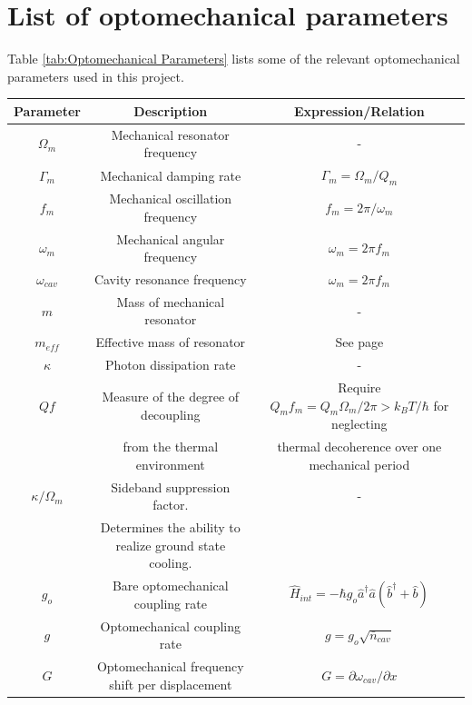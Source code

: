 \documentclass[%
 reprint,
nofootinbib,
 amsmath,amssymb,
 aps,
]{revtex4-2}
\begin{document}
\section{List of optomechanical parameters}
\flushleft
Table \ref{tab:Optomechanical Parameters} lists some of the relevant optomechanical parameters used in this project. 



\begin{table}[t]
    \centering
    \begin{tabular}{|c||c|c|}
    \hline
    Parameter & Description & Expression/Relation \\
    \hline
    
    $\Omega_m$ & Mechanical resonator frequency & - \\
    \hline
    $\Gamma_m$ & Mechanical damping rate & $\Gamma_m = \Omega_m / Q_m$ \\
    \hline
    $f_m$ & Mechanical oscillation frequency & $f_m = 2\pi/ \omega_m$ \\
    \hline
    $\omega_m$ & Mechanical angular frequency & $\omega_m = 2\pi f_m$ \\
    \hline
    $\omega_{cav}$ & Cavity resonance frequency & $\omega_m = 2\pi f_m$ \\
    \hline
    $m$ & Mass of mechanical resonator & - \\
    \hline
    $m_{eff}$ & Effective mass of resonator & See page \pageref{Vibrational Energy} \\
    \hline
    $\kappa$ & Photon dissipation rate & - \\
    \hline
    $Qf$ & Measure of the degree of decoupling & Require $Q_m f_m = Q_m \Omega_m /2\pi > k_B T / \hbar$ for neglecting \\ 
    & from the thermal environment  &  thermal decoherence over one mechanical period \\
    \hline
    $\kappa / \Omega_m$ & Sideband suppression factor.  & - \\
    & Determines the ability to realize ground state cooling.  & \\
    \hline
    $g_o$ & Bare optomechanical coupling rate & $\hat{H}_{int} = -\hbar g_o \hat{a}^\dagger \hat{a} (\hat{b}^\dagger + \hat{b} )$ \\
    \hline
    $g$ & Optomechanical coupling rate & $g = g_o \sqrt{\bar{n}_{cav}}$\\
    \hline
    $G$ & Optomechanical frequency shift per displacement & $G = \partial \omega_{cav} / \partial x$ \\

\end{tabular}
\end{table}
\end{document}
